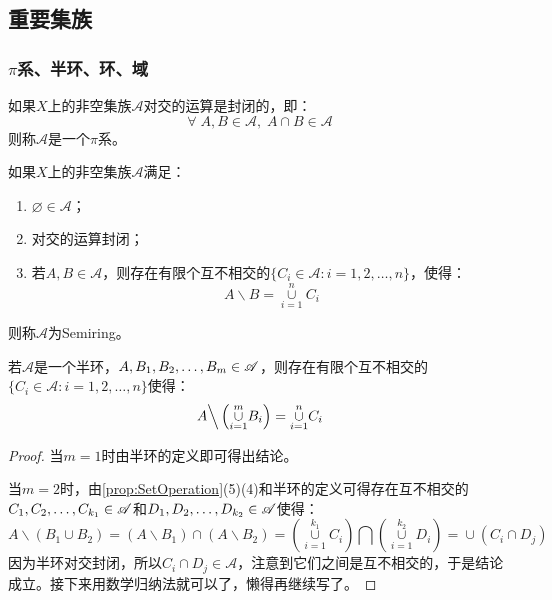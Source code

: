 \subsection{重要集族}
\subsubsection{$\pi$系、半环、环、域}
\begin{definition}
	如果$X$上的非空集族$\mathscr{A}$对交的运算是封闭的，即：
	\begin{equation*}
		\forall\;A,B\in\mathscr{A},\;A\cap B\in\mathscr{A}
	\end{equation*}
	则称$\mathscr{A}$是一个$\pi$系。
\end{definition}
\begin{definition}
	如果$X$上的非空集族$\mathscr{A}$满足：
	\begin{enumerate}
		\item $\varnothing\in\mathscr{A}$；
		\item 对交的运算封闭；
		\item 若$A,B\in\mathscr{A}$，则存在有限个互不相交的$\{C_i\in\mathscr{A}:i=1,2,\dots,n\}$，使得：
		\begin{equation*}
			A\backslash B=\underset{i=1}{\overset{n}{\cup}}C_i
		\end{equation*}
	\end{enumerate}
	则称$\mathscr{A}$为\gls{Semiring}。
\end{definition}
\begin{property}\label{prop:Semiring}
	若$\mathscr{A}$是一个半环，$A,B_1, B_2, \dots, B_{m}\in\mathscr{A}$，则存在有限个互不相交的$\{C_i\in\mathscr{A}:i=1,2,\dots,n\}$使得：
	\begin{equation*}
		A\Big\backslash\left(\underset{i=1}{\overset{m}{\cup}}B_i\right)=\underset{i=1}{\overset{n}{\cup}}C_i
	\end{equation*}
\end{property}
\begin{proof}
	当$m=1$时由半环的定义即可得出结论。\par
	当$m=2$时，由\cref{prop:SetOperation}(5)(4)和半环的定义可得存在互不相交的$C_1, C_2, \dots, C_{k_1}\in\mathscr{A}$和$D_1, D_2, \dots, D_{k_2}\in\mathscr{A}$使得：
	\begin{equation*}
		A\backslash(B_1\cup B_2)=(A\backslash B_1)\cap(A\backslash B_2)=\left(\underset{i=1}{\overset{k_1}{\cup}}C_i\right)\bigcap\left(\underset{i=1}{\overset{k_2}{\cup}}D_i\right)=\underset{}{\overset{}{\cup}}(C_i\cap D_j)
	\end{equation*}
	因为半环对交封闭，所以$C_i\cap D_j\in\mathscr{A}$，注意到它们之间是互不相交的，于是结论成立。接下来用数学归纳法就可以了，懒得再继续写了。
\end{proof}
